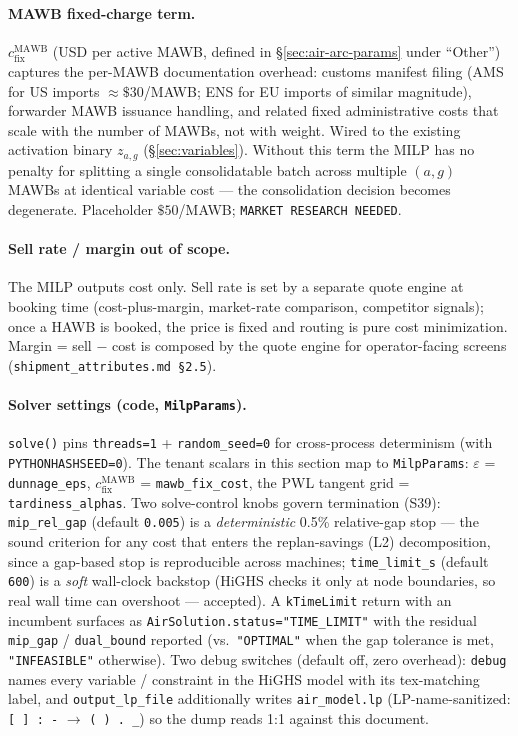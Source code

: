 \documentclass[11pt,a4paper]{article}
\theoremstyle{definition}
\begin{document}
\paragraph{MAWB fixed-charge term.}
$c^{\text{MAWB}}_{\text{fix}}$ (USD per active MAWB, defined in
\S\ref{sec:air-arc-params} under ``Other'') captures the per-MAWB documentation
overhead: customs manifest filing (AMS for US imports $\approx \$30$/MAWB; ENS
for EU imports of similar magnitude), forwarder MAWB issuance handling, and
related fixed administrative costs that scale with the number of MAWBs, not
with weight. Wired to the existing activation binary $z_{a,g}$
(\S\ref{sec:variables}). Without this term the MILP has no penalty for
splitting a single consolidatable batch across multiple $(a, g)$ MAWBs at
identical variable cost --- the consolidation decision becomes degenerate.
Placeholder $\$50$/MAWB; \texttt{MARKET RESEARCH NEEDED}.

\paragraph{Sell rate / margin out of scope.}
The MILP outputs cost only. Sell rate is set by a separate quote engine at
booking time (cost-plus-margin, market-rate comparison, competitor signals);
once a HAWB is booked, the price is fixed and routing is pure cost
minimization. Margin = sell $-$ cost is composed by the quote engine for
operator-facing screens (\texttt{shipment\_attributes.md \S2.5}).

\paragraph{Solver settings (code, \texttt{MilpParams}).}
\texttt{solve()} pins \texttt{threads=1} + \texttt{random\_seed=0} for cross-process determinism
(with \texttt{PYTHONHASHSEED=0}). The tenant scalars in this section map to \texttt{MilpParams}:
$\varepsilon$ = \texttt{dunnage\_eps}, $c^{\text{MAWB}}_{\text{fix}}$ = \texttt{mawb\_fix\_cost}, the
PWL tangent grid = \texttt{tardiness\_alphas}. Two solve-control knobs govern termination (S39):
\texttt{mip\_rel\_gap} (default \texttt{0.005}) is a \emph{deterministic} 0.5\% relative-gap stop ---
the sound criterion for any cost that enters the replan-savings (L2) decomposition, since a
gap-based stop is reproducible across machines; \texttt{time\_limit\_s} (default \texttt{600}) is a
\emph{soft} wall-clock backstop (HiGHS checks it only at node boundaries, so real wall time can
overshoot --- accepted). A \texttt{kTimeLimit} return with an incumbent surfaces as
\texttt{AirSolution.status="TIME\_LIMIT"} with the residual \texttt{mip\_gap} / \texttt{dual\_bound}
reported (vs.\ \texttt{"OPTIMAL"} when the gap tolerance is met, \texttt{"INFEASIBLE"} otherwise).
Two debug switches (default off, zero overhead): \texttt{debug} names every variable / constraint in
the HiGHS model with its tex-matching label, and \texttt{output\_lp\_file} additionally writes
\texttt{air\_model.lp} (LP-name-sanitized: \texttt{[ ] : -} $\to$ \texttt{( ) . \_}) so the dump
reads 1:1 against this document.
\end{document}
